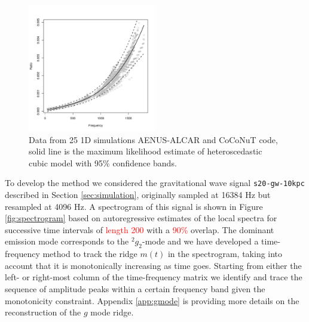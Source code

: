 \begin{figure}
 \centering
 \includegraphics[width=0.5\textwidth,height=0.3\textheight]{plots/model}
 \caption{Data from 25 1D simulations {\sc AENUS-ALCAR } and {\sc CoCoNuT}  code, solid line is the maximum likelihood estimate of heteroscedastic cubic model with 95\% confidence bands.} \label{fig:LMVAR}
\end{figure}

To develop the method we considered the gravitational wave signal
{\tt s20-gw-10kpc} described in Section \ref{sec:simulation}, originally
sampled at 16384 Hz but resampled at 4096 Hz.
A spectrogram of this signal is shown in Figure \ref{fig:spectrogram} based on
autoregressive estimates of the local spectra for successive time intervals of 
\textcolor{red}{length 200} with a \textcolor{red}{ 90\%} overlap.
The dominant emission mode corresponds to the $\mbox{}^2 g_2$-mode and we have
developed a time-frequency method to track the ridge $m(t)$ in the spectrogram,
taking into account that it is monotonically increasing as time goes.
Starting from either the left- or right-most column of the time-frequency matrix
we identify and trace the sequence of amplitude peaks within a certain frequency
band given the monotonicity constraint. Appendix \ref{app:gmode} is providing more
details on the reconstruction of the $g$ mode ridge. 


